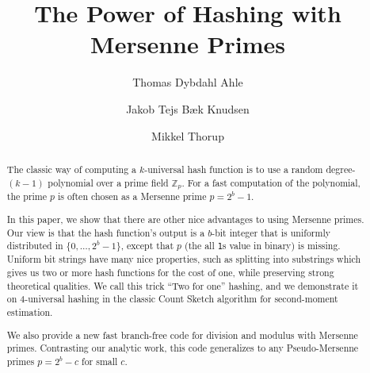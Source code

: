 \documentclass[11pt, a4paper]{article}
\title{The Power of Hashing with Mersenne Primes}
\author[1]{Thomas Dybdahl Ahle}
\author[2]{Jakob Tejs B\ae{}k Knudsen}
\author[2]{Mikkel Thorup}
\affil[1]{Facebook, BARC, \textit{thomas@ahle.dk}}
\affil[2]{University of Copenhagen, BARC, \textit {\{jakn, mthorup\}@di.ku}}
\begin{document}
\maketitle

\begin{abstract}
The classic way of computing a $k$-universal hash function is to use a random degree-$(k-1)$ polynomial over a prime field $\mathbb Z_p$.
For a fast computation of the polynomial, the prime $p$ is often chosen as a Mersenne prime $p=2^b-1$.

In this paper, we show that there are other nice advantages to using Mersenne primes.
Our view is that the hash function's output is a $b$-bit integer that is uniformly distributed in $\{0, \dots, 2^b-1\}$, except that $p$ (the all \texttt1s value in binary) is missing.
Uniform bit strings have many nice properties, such as splitting into substrings which gives us two or more hash functions for the cost of one, while preserving strong theoretical qualities.
We call this trick ``Two for one'' hashing, and we demonstrate it on 4-universal hashing in the classic Count Sketch algorithm for second-moment estimation.

We also provide a new fast branch-free code for division and modulus
with Mersenne primes. Contrasting our analytic work, this code
generalizes to any Pseudo-Mersenne primes $p=2^b-c$ for small $c$.
\end{abstract}

\setcounter{tocdepth}{2}
\renewcommand{\contentsname}{}
\vspace{-3.5em}
\tableofcontents
\newpage







% 







\end{document}
